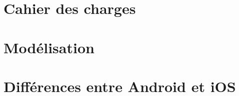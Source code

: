 \section{Cahier des charges}
	
	
\section{Modélisation}
	\label{Modelisation}
	
						
\section{Différences entre Android et iOS}
	